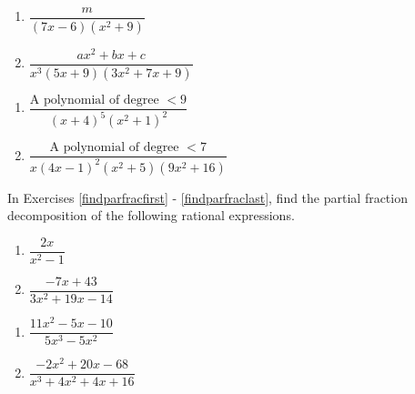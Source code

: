 \begin{multicols}{2}
\begin{enumerate}
\setcounter{enumi}{\value{HW}}


\item $\dfrac{m}{(7x - 6)(x^{2} + 9)}$
\item $\dfrac{ax^{2} + bx + c}{x^3(5x + 9)(3x^{2} + 7x + 9)}$

\setcounter{HW}{\value{enumi}}
\end{enumerate}
\end{multicols}

\begin{multicols}{2}
\begin{enumerate}
\setcounter{enumi}{\value{HW}}

\item $\dfrac{\text{A polynomial of degree } < 9}{(x + 4)^{5}(x^{2} + 1)^{2}}$
\item $\dfrac{\text{A polynomial of degree } < 7}{x(4x - 1)^{2}(x^{2} + 5)(9x^{2} + 16)}$ \label{parfracformlast}

\setcounter{HW}{\value{enumi}}
\end{enumerate}
\end{multicols}


In Exercises \ref{findparfracfirst} - \ref{findparfraclast},  find the partial fraction decomposition of the following rational expressions.

\begin{multicols}{2}
\begin{enumerate}
\setcounter{enumi}{\value{HW}}

\item $\dfrac{2x}{x^{2} - 1}$  \label{findparfracfirst}
\item $\dfrac{-7x + 43}{3x^{2} + 19x - 14}$

\setcounter{HW}{\value{enumi}}
\end{enumerate}
\end{multicols}

\begin{multicols}{2}
\begin{enumerate}
\setcounter{enumi}{\value{HW}}

\item $\dfrac{11x^{2} - 5x - 10}{5x^{3} - 5x^{2}}$
\item $\dfrac{-2x^{2} + 20x - 68}{x^{3} + 4x^{2} + 4x + 16}$

\setcounter{HW}{\value{enumi}}
\end{enumerate}
\end{multicols}

